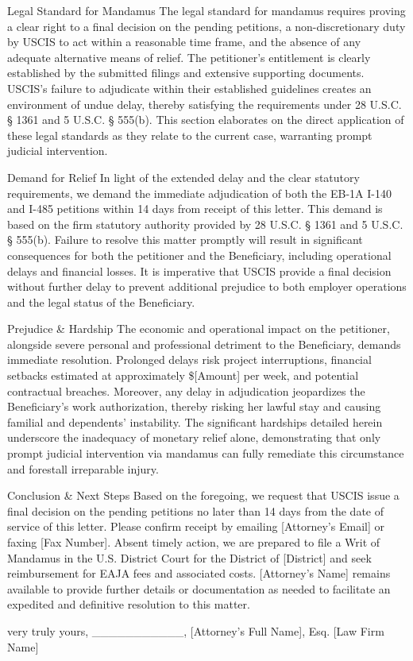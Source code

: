 Legal Standard for Mandamus
The legal standard for mandamus requires proving a clear right to a final decision on the pending petitions, a non-discretionary duty by USCIS to act within a reasonable time frame, and the absence of any adequate alternative means of relief. The petitioner’s entitlement is clearly established by the submitted filings and extensive supporting documents. USCIS’s failure to adjudicate within their established guidelines creates an environment of undue delay, thereby satisfying the requirements under 28 U.S.C. § 1361 and 5 U.S.C. § 555(b). This section elaborates on the direct application of these legal standards as they relate to the current case, warranting prompt judicial intervention.

Demand for Relief
In light of the extended delay and the clear statutory requirements, we demand the immediate adjudication of both the EB-1A I-140 and I-485 petitions within 14 days from receipt of this letter. This demand is based on the firm statutory authority provided by 28 U.S.C. § 1361 and 5 U.S.C. § 555(b). Failure to resolve this matter promptly will result in significant consequences for both the petitioner and the Beneficiary, including operational delays and financial losses. It is imperative that USCIS provide a final decision without further delay to prevent additional prejudice to both employer operations and the legal status of the Beneficiary.

Prejudice \& Hardship
The economic and operational impact on the petitioner, alongside severe personal and professional detriment to the Beneficiary, demands immediate resolution. Prolonged delays risk project interruptions, financial setbacks estimated at approximately \$[Amount] per week, and potential contractual breaches. Moreover, any delay in adjudication jeopardizes the Beneficiary’s work authorization, thereby risking her lawful stay and causing familial and dependents’ instability. The significant hardships detailed herein underscore the inadequacy of monetary relief alone, demonstrating that only prompt judicial intervention via mandamus can fully remediate this circumstance and forestall irreparable injury.

Conclusion \& Next Steps
Based on the foregoing, we request that USCIS issue a final decision on the pending petitions no later than 14 days from the date of service of this letter. Please confirm receipt by emailing [Attorney’s Email] or faxing [Fax Number]. Absent timely action, we are prepared to file a Writ of Mandamus in the U.S. District Court for the District of [District] and seek reimbursement for EAJA fees and associated costs. [Attorney’s Name] remains available to provide further details or documentation as needed to facilitate an expedited and definitive resolution to this matter.

very truly yours,
\_\_\_\_\_\_\_\_\_\_\_,
[Attorney’s Full Name], Esq.
[Law Firm Name]